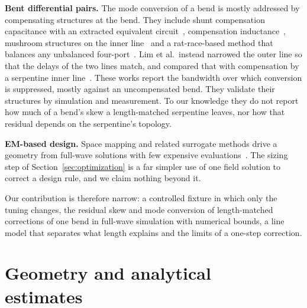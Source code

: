 \textbf{Bent differential pairs.} The mode conversion of a bend is mostly addressed by compensating structures at the bend. They include shunt
compensation capacitance with an extracted equivalent circuit~\cite{shiue2006}, compensation
inductance~\cite{chang2012}, mushroom structures on the inner line~\cite{lee2019} and a rat-race-based method that
balances any unbalanced four-port~\cite{munoz2019}. Lim et al.\ instead narrowed the outer line so that the delays of
the two lines match, and compared that with compensation by a serpentine inner line~\cite{lim2019}. These works
report the bandwidth over which conversion is suppressed, mostly against an uncompensated bend. They validate their
structures by simulation and measurement. To our knowledge they do not report how much of a bend's skew a
length-matched serpentine leaves, nor how that residual depends on the serpentine's topology.

\textbf{EM-based design.} Space mapping and related surrogate methods drive a geometry from full-wave solutions
with few expensive evaluations~\cite{bandler2004}. The sizing step of Section~\ref{sec:optimization} is a far
simpler use of one field solution to correct a design rule, and we claim nothing beyond it.

Our contribution is therefore narrow: a controlled fixture in which only the tuning changes, the residual skew
and mode conversion of length-matched corrections of one bend in full-wave simulation with numerical bounds, a line model that separates what length explains and the limits of a one-step correction.

\section[Geometry and analytical estimates]{Geometry and analytical\protect\\ estimates}
\label{sec:geometry}

